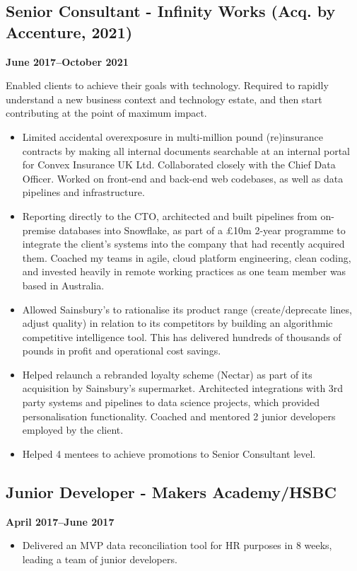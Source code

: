 \documentclass[a4paper]{scrartcl}
\begin{document}
\subsection*{Senior Consultant - Infinity Works (Acq. by Accenture, 2021)}
\textbf{June 2017--October 2021}

Enabled clients to achieve their goals with technology. Required to rapidly understand a new business context and technology estate, and then start contributing at the point of maximum impact.
\begin{itemize}
	\item Limited accidental overexposure in multi-million pound
	      (re)insurance contracts by making
	      all internal documents searchable at an internal portal for Convex
	      Insurance UK Ltd. Collaborated closely with the Chief Data Officer. Worked on front-end and back-end web codebases, as well as data pipelines and infrastructure.
	\item Reporting directly to the CTO, architected and built pipelines from on-premise databases into
	      Snowflake, as part of a £10m 2-year programme to integrate the
	      client's systems into the company that had recently acquired them.
	      Coached my teams in agile, cloud platform engineering, clean
	      coding,
	      and invested heavily in remote working practices as one team member
	      was based
	      in Australia.
	\item Allowed Sainsbury's to rationalise its product range (create/deprecate lines, adjust
	      quality) in relation to its competitors by
	      building an
	      algorithmic competitive intelligence tool. This has delivered
	      hundreds of
	      thousands of pounds in profit and operational cost savings.
	\item Helped relaunch a rebranded loyalty scheme (Nectar) as part of its acquisition by Sainsbury's supermarket. Architected integrations with 3rd party systems
	      and pipelines to data science projects, which provided personalisation functionality. Coached and mentored 2 junior
	      developers
	      employed by the client.
	\item Helped 4 mentees to achieve
	      promotions to Senior Consultant level.
\end{itemize}

\subsection*{Junior Developer - Makers Academy/HSBC}
\textbf{April 2017--June 2017}
\begin{itemize}
	\item Delivered an MVP data reconciliation tool for HR purposes in 8
	      weeks, leading a team of junior developers.
\end{itemize}
\end{document}
